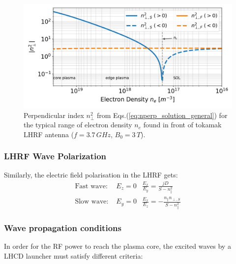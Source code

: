 \begin{figure}[h]
	\centering
	\includegraphics[width=1.0\linewidth]{figures/chap2/n_perp_square_vs_ne_LHRF}
	\caption{Perpendicular index $n_\perp^2$ from Eqs.(\ref{eq:nperp_solution_general})   for the typical range of electron density $n_e$ found in front of tokamak LHRF antenna ($f=3.7\,\si{GHz}$, $B_0=3\,\si{T}$).}
	\label{fig:nperpsquarevsne_LHRF}
\end{figure}


\subsubsection{LHRF Wave Polarization}
Similarly, the electric field polarisation in the LHRF gets:
\begin{subequations}
	\begin{eqnarray}
	\mbox{Fast wave: } & E_z = 0 & \frac{E_x}{E_y}= \frac{j D}{S - n_\parallel^2} \\
	\mbox{Slow wave: } & E_y = 0 & \frac{E_x}{E_z}=- \frac{n_\parallel n_{\perp,S} }{S - n_\parallel^2}
	\end{eqnarray}
\end{subequations}

\subsubsection{Wave propagation conditions}
In order for the RF power to reach the plasma core, the excited waves by a LHCD launcher must satisfy different criteria: 

